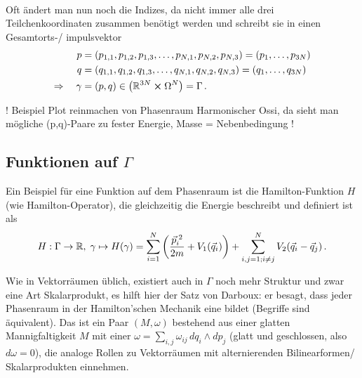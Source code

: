 \documentclass[../class_mech_main.tex]{subfiles}
\begin{document}
	\\

Oft ändert man nun noch die Indizes, da nicht immer alle drei Teilchenkoordinaten zusammen benötigt werden und schreibt sie in einen Gesamtorts-/ impulsvektor
\begin{align}
p &= (p_{1,1}, p_{1,2}, p_{1,3}, \dots, p_{N,1}, p_{N,2}, p_{N,3}) = (p_1, \dots, p_{3N})
\\
q &= (q_{1,1}, q_{1,2}, q_{1,3}, \dots, q_{N,1}, q_{N,2}, q_{N,3}) = (q_1, \dots, q_{3N})
\\
\Rightarrow \quad \gamma &= (p, q) \in \qty(\mathbb{R}^{3N} \cross \Omega^{N}) = \Gamma \, .
\end{align}

! Beispiel Plot reinmachen von Phasenraum Harmonischer Ossi, da sieht man mögliche (p,q)-Paare zu fester Energie, Masse = Nebenbedingung !



	\subsection{Funktionen auf $\Gamma$}
Ein Beispiel für eine Funktion auf dem Phasenraum ist die Hamilton-Funktion $H$ (wie Hamilton-Operator), die gleichzeitig die Energie beschreibt und definiert ist als
\begin{align}
H: \Gamma \rightarrow \mathbb{R}, \; \gamma \mapsto H(\gamma) = \sum\limits_{i = 1}^N \qty(\frac{\vec{p}^{\;2}_i}{2m} + V_1(\vec{q}_i)) + \sum\limits_{i,j = 1; i \neq j}^N V_2(\vec{q}_i - \vec{q}_j) \, .
\end{align}




Wie in Vektorräumen üblich, existiert auch in $\Gamma$ noch mehr Struktur und zwar eine Art Skalarprodukt, es hilft hier der Satz von Darboux: er besagt, dass jeder Phasenraum in der Hamilton'schen Mechanik eine  bildet (Begriffe sind äquivalent). Das ist ein Paar $(M, \omega)$ bestehend aus einer glatten Mannigfaltigkeit $M$ mit einer  $\omega = \sum\limits_{i,j} \omega_{ij} \, dq_i \wedge dp_j$ (glatt und geschlossen, also $d\omega = 0$), die analoge Rollen zu Vektorräumen mit alternierenden Bilinearformen/ Skalarprodukten einnehmen.
\end{document}
